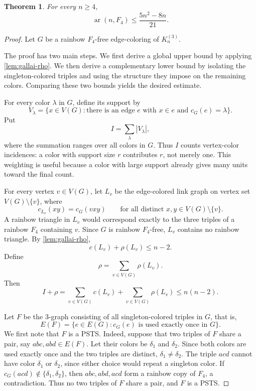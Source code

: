 \documentclass[10pt,a4paper]{amsart}
\newtheorem{theorem}{Theorem}
\DeclareMathOperator{\ar}{ar}
\begin{document}
\begin{theorem}\label{thm:asymptotic-all-n}
    For every $n\ge4$,
    \[
        \ar(n,F_4)\le \frac{5n^2-8n}{21}.
    \]
\end{theorem}

\begin{proof}
    Let $G$ be a rainbow $F_4$-free edge-coloring of $K_n^{(3)}$.

    The proof has two main steps.  We first derive a global upper bound by
    applying \cref{lem:gallai-rho}.
    We then derive a complementary lower bound by isolating the singleton-colored triples and using the structure they impose on the remaining colors.
    Comparing these two bounds yields the desired estimate.

    For every color $\lambda$ in $G$, define its support by
    \[
        V_\lambda=\{x\in V(G)\colon \text{there is an edge } e \text{ with } x\in e \text{ and } c_G(e)=\lambda\}.
    \]
    Put
    \[
        I=\sum_\lambda |V_\lambda|,
    \]
    where the summation ranges over all colors in $G$.
    Thus $I$ counts vertex-color incidences: a color with support size $r$ contributes $r$, not merely one.
    This weighting is useful because a color with large support already gives many units toward the final count.

    For every vertex $v\in V(G)$, let $L_v$ be the edge-colored link graph on vertex set $V(G)\setminus\{v\}$, where
    \[
        c_{L_v}(xy)=c_G(vxy)
        \qquad\text{for all distinct }x,y\in V(G)\setminus\{v\}.
    \]
    A rainbow triangle in $L_v$ would correspond exactly to the three triples of a rainbow $F_4$ containing $v$.
    Since $G$ is rainbow $F_4$-free, $L_v$ contains no rainbow triangle.
    By \cref{lem:gallai-rho},
    \[
        c(L_v)+\rho(L_v)\le n-2.
    \]
    Define
    \[
        \rho=\sum_{v\in V(G)}\rho(L_v).
    \]
    Then
    \begin{equation}\label{eq:I-rho-upper}
        I+\rho
        =
        \sum_{v\in V(G)}c(L_v)+\sum_{v\in V(G)}\rho(L_v)
        \le n(n-2).
    \end{equation}

    Let $F$ be the $3$-graph consisting of all singleton-colored triples in $G$, that is,
    \[
        E(F)=\{e\in E(G)\colon c_G(e)\text{ is used exactly once in }G\}.
    \]
    We first note that $F$ is a PSTS.
    Indeed, suppose that two triples of $F$ share a pair, say $abc,abd\in E(F)$.
    Let their colors be $\delta_1$ and $\delta_2$.  Since both colors are used
    exactly once and the two triples are distinct, $\delta_1\ne\delta_2$.
    The triple $acd$ cannot have color $\delta_1$ or $\delta_2$, since either
    choice would repeat a singleton color.
    If $c_G(acd)\notin\{\delta_1,\delta_2\}$, then $abc,abd,acd$ form a rainbow copy of $F_4$, a contradiction.
    Thus no two triples of
    $F$ share a pair, and $F$ is a PSTS.


\end{proof}
\end{document}
